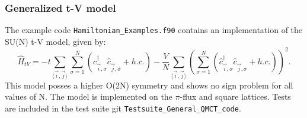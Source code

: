 \subsubsection{ Generalized t-V model }

The example code \texttt{Hamiltonian\_Examples.f90}   contains  an implementation of the SU(N)  t-V model, given by: 
\begin{equation}
	  \hat{H}_{tV} =   
	   -  t  \sum_{\langle \vec{i}, \vec{j} \rangle}   \sum_{\sigma =1}^{N} 
	  \left( \hat{c}^{\dagger}_{\vec{i},\sigma} \hat{c}^{\phantom{\dagger}}_{\vec{j},\sigma}    + h.c. \right)    -\frac{V}{N}  \sum_{\langle \vec{i}, \vec{j} \rangle} 
	   \left( \sum_{\sigma =1}^{N} 
	  \left( \hat{c}^{\dagger}_{\vec{i},\sigma} \hat{c}^{\phantom{\dagger}}_{\vec{j},\sigma}    + h.c. \right)  \right)^2. 
\end{equation}
This model  posses a higher O(2N) symmetry and shows no sign problem  for all values of N.   The model  is implemented on the $\pi$-flux and  square lattices. Tests are included in the test suite git \texttt{Testsuite\_General\_QMCT\_code}.


